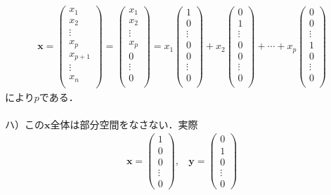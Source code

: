 \documentclass[dvipdfmx,uplatex,11pt]{jsarticle}
\theoremstyle{definition}
\begin{document}
\begin{eqnarray*}
\bm{x}=
\begin{pmatrix}
x_1 \\
x_2 \\
\vdots \\
x_{p} \\
x_{p+1} \\
\vdots \\
x_n \\
\end{pmatrix}
=
\begin{pmatrix}
x_1 \\
x_2 \\
\vdots \\
x_{p} \\
0 \\
\vdots \\
0 \\
\end{pmatrix}
=x_1
\begin{pmatrix}
1 \\
0 \\
\vdots \\
0 \\
0 \\
\vdots \\
0 \\
\end{pmatrix}
+x_2
\begin{pmatrix}
0 \\
1 \\
\vdots \\
0 \\
0 \\
\vdots \\
0 \\
\end{pmatrix}
+\cdots +x_p
\begin{pmatrix}
0 \\
0 \\
\vdots \\
1 \\
0 \\
\vdots \\
0 \\
\end{pmatrix}
\end{eqnarray*}
により$p$である．\\
\dotfill \\
ハ）この$\bm{x}全体$は部分空間をなさない．実際
\begin{eqnarray*}
\bm{x}=
\begin{pmatrix}
1 \\
0 \\
0 \\
\vdots \\
0
\end{pmatrix}
,~~~~
\bm{y}=
\begin{pmatrix}
0 \\
1 \\
0 \\
\vdots \\
0
\end{pmatrix}
\end{eqnarray*}
\end{document}
